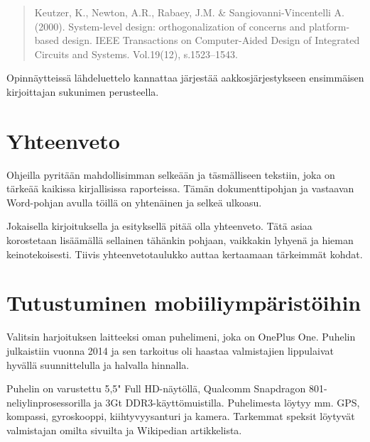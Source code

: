 \documentclass[globalnumbering,centeredcaptions]{tutthesis/tutthesis} %
\newif\ifnameyear
\begin{document}
\begin{quotation}
Keutzer, K., Newton, A.R., Rabaey, J.M. \& Sangiovanni-Vincentelli A. (2000). System-level design: orthogonalization of concerns and platform-based design. IEEE Transactions on Computer-Aided Design of Integrated Circuits and Systems. Vol.19(12), s.1523--1543.
\end{quotation}

Opinnäytteissä lähdeluettelo kannattaa järjestää aakkosjärjestykseen ensimmäisen kirjoittajan sukunimen perusteella.



\chapter{Yhteenveto}
\label{ch:yhteenveto}

Ohjeilla pyritään mahdollisimman selkeään ja täsmälliseen tekstiin, joka on tärkeää kaikissa kirjallisissa raporteissa.
Tämän dokumenttipohjan ja vastaavan Word-pohjan avulla töillä on yhtenäinen ja selkeä ulkoasu.

Jokaisella kirjoituksella ja esityksellä pitää olla yhteenveto.
Tätä asiaa korostetaan lisäämällä sellainen tähänkin pohjaan, vaikkakin lyhyenä ja hieman keinotekoisesti.
Tiivis yhteenvetotaulukko auttaa kertaamaan tärkeimmät kohdat.



\addto\extrasenglish{\btxifchangecaseoff} %

\ifnameyear
  
\else
  
\fi

\fi



\appendix

\chapter{Tutustuminen mobiiliympäristöihin}
\label{ch:harjoitus1}

Valitsin harjoituksen laitteeksi oman puhelimeni, joka on OnePlus One. Puhelin julkaistiin vuonna 2014 ja sen tarkoitus oli haastaa valmistajien lippulaivat hyvällä suunnittelulla ja halvalla hinnalla.

Puhelin on varustettu 5,5" Full HD-näytöllä, Qualcomm Snapdragon 801-neliylinprosessorilla ja 3Gt DDR3-käyttömuistilla. Puhelimesta löytyy mm. GPS, kompassi, gyroskooppi, kiihtyvyysanturi ja kamera. Tarkemmat speksit löytyvät valmistajan omilta sivuilta ja Wikipedian artikkelista.
\end{document}
